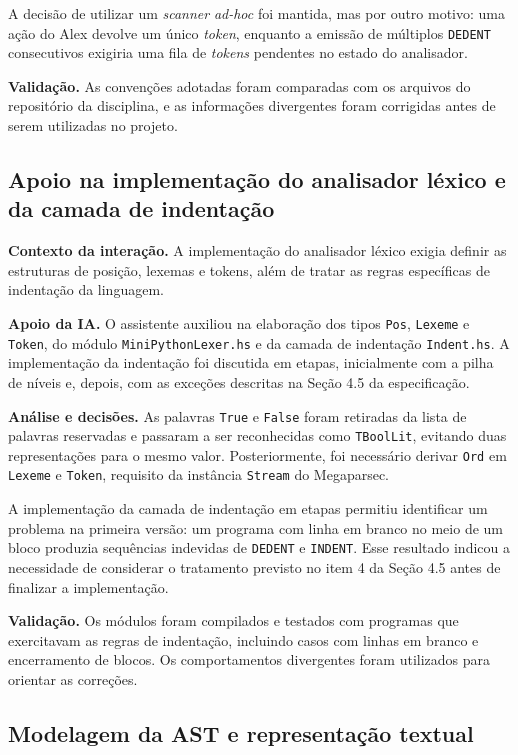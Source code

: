 A decisão de utilizar um \emph{scanner} \emph{ad-hoc} foi mantida,
mas por outro motivo: uma ação do Alex devolve um único
\emph{token}, enquanto a emissão de múltiplos \texttt{DEDENT}
consecutivos exigiria uma fila de \emph{tokens} pendentes no estado
do analisador.

\textbf{Validação.} As convenções adotadas foram comparadas com
os arquivos do repositório da disciplina, e as informações
divergentes foram corrigidas antes de serem utilizadas no projeto.

\subsection{Apoio na implementação do analisador léxico e da camada de indentação}

\textbf{Contexto da interação.} A implementação do analisador léxico
exigia definir as estruturas de posição, lexemas e tokens, além
de tratar as regras específicas de indentação da linguagem.

\textbf{Apoio da IA.} O assistente auxiliou na elaboração dos tipos
\texttt{Pos}, \texttt{Lexeme} e \texttt{Token}, do módulo
\texttt{MiniPythonLexer.hs} e da camada de indentação
\texttt{Indent.hs}. A implementação da indentação foi discutida
em etapas, inicialmente com a pilha de níveis e, depois, com
as exceções descritas na Seção 4.5 da especificação.

\textbf{Análise e decisões.} As palavras \texttt{True} e
\texttt{False} foram retiradas da lista de palavras reservadas
e passaram a ser reconhecidas como \texttt{TBoolLit}, evitando
duas representações para o mesmo valor. Posteriormente, foi
necessário derivar \texttt{Ord} em \texttt{Lexeme} e
\texttt{Token}, requisito da instância \texttt{Stream} do
Megaparsec.

A implementação da camada de indentação em etapas permitiu
identificar um problema na primeira versão: um programa com
linha em branco no meio de um bloco produzia sequências
indevidas de \texttt{DEDENT} e \texttt{INDENT}. Esse resultado
indicou a necessidade de considerar o tratamento previsto no
item 4 da Seção 4.5 antes de finalizar a implementação.

\textbf{Validação.} Os módulos foram compilados e testados com
programas que exercitavam as regras de indentação, incluindo
casos com linhas em branco e encerramento de blocos. Os
comportamentos divergentes foram utilizados para orientar
as correções.

\subsection{Modelagem da AST e representação textual}


